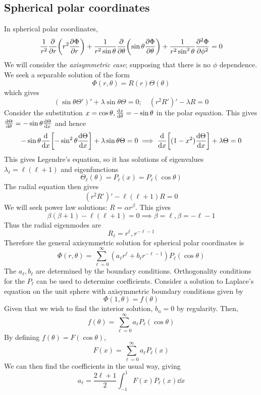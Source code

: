 \subsection{Spherical polar coordinates}
In spherical polar coordinates,
\[
	\frac{1}{r^2} \pdv{r} \qty(r^2 \pdv{\Phi}{r}) + \frac{1}{r^2 \sin\theta}\pdv{\theta} \qty(\sin\theta \pdv{\Phi}{\theta}) + \frac{1}{r^2 \sin^2 \theta} \pdv[2]{\Phi}{\phi} = 0
\]
We will consider the \textit{axisymmetric case}; supposing that there is no \( \phi \) dependence.
We seek a separable solution of the form
\[
	\Phi(r,\theta) = R(r) \Theta(\theta)
\]
which gives
\[
	(\sin\theta \Theta')' + \lambda \sin\theta \Theta = 0;\quad (r^2R')' - \lambda R = 0
\]
Consider the substitution \( x = \cos\theta, \dv{x}{\theta} = -\sin\theta \) in the polar equation.
This gives \( \dv{\Theta}{\theta} = -\sin\theta \dv{\Theta}{x} \) and hence
\[
	-\sin\theta \dv{x}\qty[-\sin^2\theta \dv{\Theta}{x}] + \lambda \sin\theta \Theta = 0 \implies \dv{x}\qty[(1-x^2)\dv{\Theta}{x}] + \lambda \Theta = 0
\]
This gives Legendre's equation, so it has solutions of eigenvalues \( \lambda_\ell = \ell (\ell + 1) \) and eigenfunctions
\[
	\Theta_\ell(\theta) = P_\ell(x) = P_\ell(\cos\theta)
\]
The radial equation then gives
\[
	(r^2 R')' - \ell (\ell + 1) R = 0
\]
We will seek power law solutions: \( R = \alpha r^\beta \).
This gives
\[
	\beta(\beta + 1) - \ell(\ell + 1) = 0 \implies \beta = \ell, \beta = -\ell - 1
\]
Thus the radial eigenmodes are
\[
	R_\ell = r^{\ell}, r^{-\ell - 1}
\]
Therefore the general axisymmetric solution for spherical polar coordinates is
\[
	\Phi(r,\theta) = \sum_{\ell = 0}^\infty (a_\ell r^{\ell} + b_\ell r^{-\ell - 1}) P_\ell(\cos\theta)
\]
The \( a_\ell, b_\ell \) are determined by the boundary conditions.
Orthogonality conditions for the \( P_\ell \) can be used to determine coefficients.
Consider a solution to Laplace's equation on the unit sphere with axisymmetric boundary conditions given by
\[
	\Phi(1,\theta) = f(\theta)
\]
Given that we wish to find the interior solution, \( b_n = 0 \) by regularity.
Then,
\[
	f(\theta) = \sum_{\ell=0}^\infty a_\ell P_\ell(\cos\theta)
\]
By defining \( f(\theta) = F(\cos\theta) \),
\[
	F(x) = \sum_{\ell=0}^\infty a_\ell P_\ell(x)
\]
We can then find the coefficients in the usual way, giving
\[
	a_\ell = \frac{2\ell + 1}{2} \int_{-1}^1 F(x) P_{\ell}(x) \dd{x}
\]

